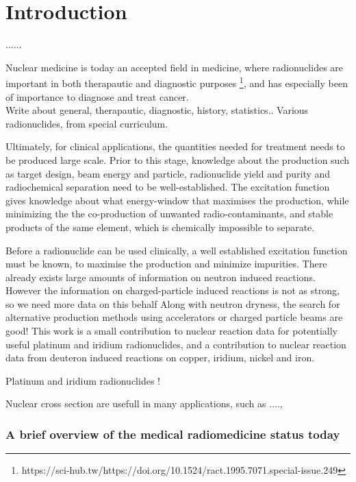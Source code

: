 \chapter{Introduction}

......


Nuclear medicine is today an accepted field in medicine, where radionuclides are important in both therapautic and diagnostic purposes \footnote{https://sci-hub.tw/https://doi.org/10.1524/ract.1995.7071.special-issue.249}, and has especially  been of importance to diagnose and treat cancer. \\

Write about general, therapautic, diagnostic, history, statistics.. Various radionuclides, from special curriculum.  

Ultimately, for clinical applications, the quantities needed for treatment needs to be produced large scale. Prior to this stage, knowledge about the production such as target design, beam energy and particle, radionuclide yield and purity and radiochemical separation need to be well-established\cite{Graves2016}. The excitation function gives knowledge about what energy-window that maximises the production, while minimizing the the co-production of unwanted radio-contaminants, and stable products of the same element, which is chemically impossible to separate.  


Before a radionuclide can be used clinically, a well established excitation function must be known, to maximise the production and minimize impurities. There already exists large amounts of information on neutron induced reactions. However the information on charged-particle induced reactions is not as strong, so we need more data on this behalf  Along with neutron dryness, the search for alternative production methods using accelerators or charged particle beams are good!  
This work is a small contribution to nuclear reaction data for potentially useful platinum and iridium radionuclides, and a contribution to nuclear reaction data from deuteron induced reactions on copper, iridium, nickel and iron. 

Platinum and iridium radionuclides ! 

Nuclear cross section are usefull in many applications, such as ...., 


\subsection{A brief overview of the medical radiomedicine status today }


